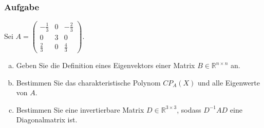 \documentclass[a4paper,11pt]{scrartcl}
\newcounter{auf}
\newcommand{\Aufgabe}%
        {\addtocounter{auf}{1} \subsubsection*{\rmfamily  Aufgabe \theauf \hspace{1em}} }
\newcommand{\RR}{\mathbb{R}}
\begin{document}
\newpage
\Aufgabe
Sei $A=\begin{pmatrix} -\frac{1}{3} & 0 & -\frac{2}{3} \\ 0 & 3 & 0 \\ \frac{2}{3} & 0 &\frac{4}{3} \end{pmatrix}$. 
\begin{enumerate}[a)]
\item Geben Sie die Definition eines Eigenvektors einer Matrix $B \in \RR^{n\times n}$ an.
\item Bestimmen Sie das charakteristische Polynom $CP_A(X)$ und alle Eigenwerte von $A$.
\item Bestimmen Sie eine invertierbare Matrix $D \in \RR^{3 \times 3}$, sodass $D^{-1}AD$ eine Diagonalmatrix ist.
\end{enumerate}
\end{document}
